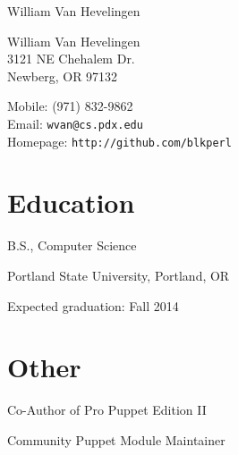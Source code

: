 \documentclass[10pt,letterpaper]{article}
\def\name{William Van Hevelingen}
\renewenvironment{itemize}{
  \begin{list}{}{
    \setlength{\leftmargin}{1.5em}
    \setlength{\itemsep}{0.25em}
    \setlength{\parskip}{0pt}
    \setlength{\parsep}{0.25em}
  }
}{
  \end{list}
}
\begin{document}
{\huge \name}


\vspace{0.25in}

\begin{minipage}[t]{0.5\textwidth}
  William Van Hevelingen\\
  3121 NE Chehalem Dr.\\
  Newberg, OR 97132
\end{minipage}
\begin{minipage}[t]{0.5\textwidth}
  Mobile: (971) 832-9862 \\
  Email: \texttt{wvan@cs.pdx.edu} \\
  Homepage: \texttt{http://github.com/blkperl} \\
\end{minipage}



\begin{minipage}[t]{0.5\textwidth}
\section*{Education}
\begin{itemize}

  \item B.S., Computer Science
  \item Portland State University, Portland, OR
  \item Expected graduation: Fall 2014
  
\end{itemize}
\end{minipage}
\begin{minipage}[t]{0.5\textwidth}
\section*{Other}
\begin{itemize}
\item Co-Author of Pro Puppet Edition II
\item Community Puppet Module Maintainer
\end{itemize}
\end{minipage}
\end{document}
